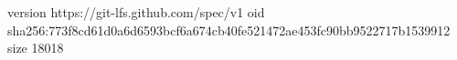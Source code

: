version https://git-lfs.github.com/spec/v1
oid sha256:773f8cd61d0a6d6593bcf6a674cb40fe521472ae453fc90bb9522717b1539912
size 18018
